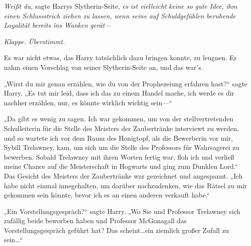 \emph{Weißt du,} sagte Harrys Slytherin-Seite, \emph{es ist vielleicht keine so gute Idee, ihm einen Schlussstrich ziehen zu lassen, wenn seine auf Schuldgefühlen beruhende Loyalität bereits ins Wanken gerät—}

\emph{Klappe. Überstimmt.}

Es war nicht etwas, das Harry tatsächlich dazu bringen konnte, zu leugnen. Er nahm einen Vorschlag von seiner Slytherin-Seite an, und das war’s.

„Wirst du mir genau erzählen, wie du von der Prophezeiung erfahren hast?“ sagte Harry. „Es tut mir leid, dass ich das zu einem Handel mache, ich werde es dir nachher erzählen, nur, es könnte wirklich wichtig sein—“

„Da gibt es wenig zu sagen. Ich war gekommen, um von der stellvertretenden Schulleiterin für die Stelle des Meisters der Zaubertränke interviewt zu werden, und so wartete ich vor dem Raum des Honigtopf, als die Bewerberin vor mir, Sybill Trelawney, kam, um sich um die Stelle des Professors für Wahrsagerei zu bewerben. Sobald Trelawney mit ihren Worten fertig war, floh ich und verließ meine Chance auf die Meisterschaft in Hogwarts und ging zum Dunklen Lord.“
Das Gesicht des Meisters der Zaubertränke war gezeichnet und angespannt.
„Ich habe nicht einmal innegehalten, um darüber nachzudenken, wie das Rätsel zu mir gekommen sein könnte, bevor ich es an einen anderen verkauft habe.“

„Ein Vorstellungsgespräch?“ sagte Harry. „Wo Sie und Professor Trelawney sich zufällig beide beworben haben und Professor McGonagall das Vorstellungsgespräch geführt hat? Das scheint…ein ziemlich großer Zufall zu sein…“

